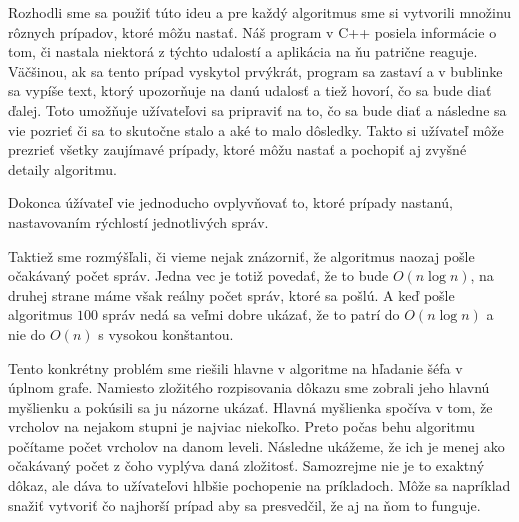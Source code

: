 Rozhodli sme sa použiť túto ideu a pre každý algoritmus sme si vytvorili množinu rôznych prípadov,
ktoré môžu nastať. Náš program v C++ posiela informácie o tom, či nastala niektorá z týchto udalostí
a aplikácia na ňu patrične reaguje. Väčšinou, ak sa tento prípad vyskytol prvýkrát, program sa
zastaví a v bublinke sa vypíše text, ktorý upozorňuje na danú udalosť a tiež hovorí, čo sa bude
diať ďalej. Toto umožňuje užívateľovi sa pripraviť na to, čo sa bude diať a následne sa vie pozrieť
či sa to skutočne stalo a aké to malo dôsledky. Takto si užívateľ môže prezrieť všetky zaujímavé
prípady, ktoré môžu nastať a pochopiť aj zvyšné detaily algoritmu.

Dokonca úžívateľ vie jednoducho ovplyvňovať to, ktoré prípady nastanú, nastavovaním rýchlostí
jednotlivých správ.

Taktiež sme rozmýšľali, či vieme nejak znázorniť, že algoritmus naozaj pošle očakávaný počet správ.
Jedna vec je totiž povedať, že to bude $O(n\log n)$, na druhej strane máme však reálny počet správ,
ktoré sa pošlú. A keď pošle algoritmus $100$ správ nedá sa veľmi dobre ukázať, že to patrí do $O(n
\log n)$ a nie do $O(n)$ s vysokou konštantou.

Tento konkrétny problém sme riešili hlavne v algoritme na hľadanie šéfa v úplnom grafe. Namiesto
zložitého rozpisovania dôkazu sme zobrali jeho hlavnú myšlienku a pokúsili sa ju názorne ukázať.
Hlavná myšlienka spočíva v tom, že vrcholov na nejakom stupni je najviac niekoľko. Preto počas behu
algoritmu počítame počet vrcholov na danom leveli. Následne ukážeme, že ich je menej ako očakávaný
počet z čoho vyplýva daná zložitosť. Samozrejme nie je to exaktný dôkaz, ale dáva to užívateľovi
hlbšie pochopenie na príkladoch. Môže sa napríklad snažiť vytvoriť čo najhorší prípad aby sa
presvedčil, že aj na ňom to funguje.
